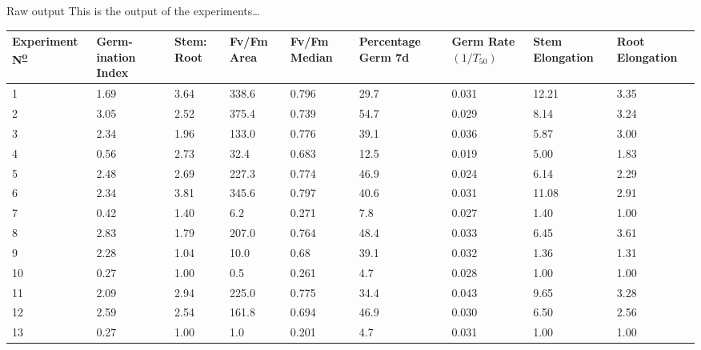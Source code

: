 \documentclass[10pt]{beamer}
\begin{document}
\begin{frame}{Raw output}
	This is the output of the experiments\dots
\begin{table}[htpb]\scriptsize
\centering
\begin{tabular}{p{1.2cm} |  p{1cm}   p{0.5cm}  p{0.8cm}   p{0.8cm}  p{1cm}   p{0.8cm}  p{0.8cm}   p{0.8cm}}
\hline
\textbf{Experiment N\textsuperscript{\underline{o}}} & \textbf{Germ- ination Index}   & \textbf{Stem: Root}  & \textbf{Fv/Fm Area}  & \textbf{Fv/Fm Median}  & \textbf{Percentage Germ 7d} & \textbf{Germ Rate $(1/T_{50})$} & \textbf{Stem Elongation} & \textbf{Root Elongation}\\
\hline
1   &      1.69    &    3.64   &    	338.6   &    	0.796   &    	29.7   &    	0.031   &    	12.21   &    	3.35\\
2   &      3.05    &    2.52   &    	375.4   &    	0.739   &    	54.7   &    	0.029   &    	8.14   &    	3.24\\	
3   &      2.34    &    1.96   &    	133.0   &    	0.776   &    	39.1   &   	0.036   &    	5.87   &    	3.00\\
4   &      0.56    &    2.73   &    	32.4   &    	0.683   &    	12.5   &   	0.019   &    	5.00   &    	1.83\\
5   &      2.48    &    2.69   &    	227.3   &    	0.774   &    	46.9   &   	0.024   &    	6.14   &    	2.29\\
6   &      2.34    &    3.81   &    	345.6   &    	0.797   &    	40.6   &   	0.031   &    	11.08   &    	2.91\\ 
7   &      0.42    &    1.40   &   	6.2   &    	0.271   &    	7.8   &   	0.027   &    	1.40   &    	1.00\\
8   &      2.83    &    1.79   &    	207.0   &    	0.764   &    	48.4   &    	0.033   &    	6.45   &    	3.61\\ 
9   &      2.28    &    1.04   &    	10.0   &    	0.68   &    	39.1   &   	0.032   &    	1.36   &    	1.31\\
10   &    0.27   &     1.00   &    	0.5   &    	0.261   &    	4.7   &    	0.028   &    	1.00   &    	1.00\\
11   &    2.09   &     2.94   &    	225.0   &    	0.775   &    	34.4   &    	0.043   &    	9.65   &    	3.28\\
12   &    2.59   &     2.54   &    	161.8   &    	0.694   &   	46.9   &   	0.030   &    	6.50   &    	2.56\\
13   &    0.27   &     1.00   &    	1.0   &    	0.201   &    	4.7   &    	0.031   &    	1.00   &    	1.00\\

\end{tabular}
\end{table}
\end{frame}
\end{document}
